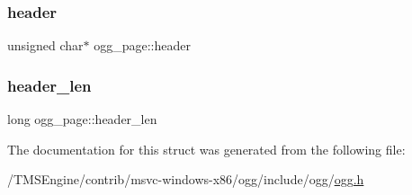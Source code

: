 \mbox{\label{structogg__page_a9f251dc1a96fbfd84ff2585fbbc03c16}} 
\subsubsection{\texorpdfstring{header}{header}}
{\footnotesize\ttfamily unsigned char$\ast$ ogg\+\_\+page\+::header}

\mbox{\label{structogg__page_aeaa6edc2ff9f2c5cc8f0ecf001936b7b}} 
\subsubsection{\texorpdfstring{header\+\_\+len}{header\_len}}
{\footnotesize\ttfamily long ogg\+\_\+page\+::header\+\_\+len}



The documentation for this struct was generated from the following file\+:\begin{DoxyCompactItemize}
\item 
/\+T\+M\+S\+Engine/contrib/msvc-\/windows-\/x86/ogg/include/ogg/\hyperlink{ogg_8h}{ogg.\+h}\end{DoxyCompactItemize}
